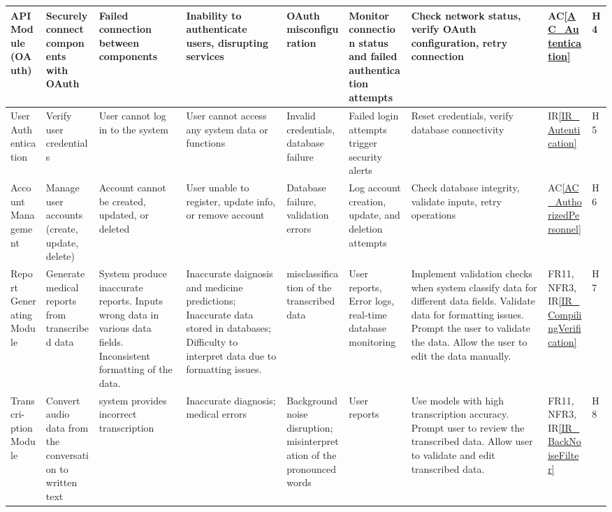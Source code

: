 \documentclass{article}
\begin{document}
\begin{landscape}
\begin{longtable}{|p{1.5cm}|p{2cm}|p{2.6cm}|p{2cm}|p{2cm}|p{2cm}|p{3.5cm}|p{1cm}|p{0.8cm}|}
        \midrule
        API Module (OAuth) & \raggedright Securely connect components with OAuth & \raggedright Failed connection between components & \raggedright Inability to authenticate users, disrupting services & \raggedright OAuth misconfiguration & \raggedright Monitor connection status and failed authentication attempts & \raggedright Check network status, verify OAuth configuration, retry connection & AC\ref{AC_Autentication} & H4 \\
        \midrule
        User Authentication & \raggedright Verify user credentials & \raggedright User cannot log in to the system & \raggedright User cannot access any system data or functions & \raggedright Invalid credentials, database failure & \raggedright Failed login attempts trigger security alerts & \raggedright Reset credentials, verify database connectivity & IR\ref{IR_Autentication} & H5 \\
        \midrule
        Account Management & \raggedright Manage user accounts (create, update, delete) & \raggedright Account cannot be created, updated, or deleted & \raggedright User unable to register, update info, or remove account & \raggedright Database failure, validation errors & \raggedright Log account creation, update, and deletion attempts & \raggedright Check database integrity, validate inputs, retry operations & AC\ref{AC_AuthorizedPersonnel} & H6 \\ 
        \midrule
        Report Generating Module & \raggedright Generate medical reports from transcribed data & \raggedright System produce inaccurate reports. Inputs wrong data in various data fields. Inconsistent formatting of the data. & \raggedright Inaccurate daignosis and medicine predictions; Inaccurate data stored in databases; Difficulty to interpret data due to formatting issues. & \raggedright misclassification of the transcribed data & \raggedright User reports, Error logs, real-time database monitoring & \raggedright Implement validation checks when system classify data for different data fields. Validate data for formatting issues. Prompt the user to validate the data. Allow the user to edit the data manually. &  FR11, NFR3, IR\ref{IR_CompilingVerification} & H7 \\
        \midrule
        Transcri-ption Module & \raggedright Convert audio data from the conversation to written text & \raggedright system provides incorrect transcription & \raggedright Inaccurate diagnosis; medical errors & \raggedright Background noise disruption; misinterpretation of the pronounced words & \raggedright User reports & \raggedright Use models with high transcription accuracy. Prompt user to review the transcribed data. Allow user to validate and edit transcribed data. & FR11, NFR3, IR\ref{IR_BackNoiseFilter} & H8 \\ 

\end{longtable}
\end{landscape}
\end{document}
